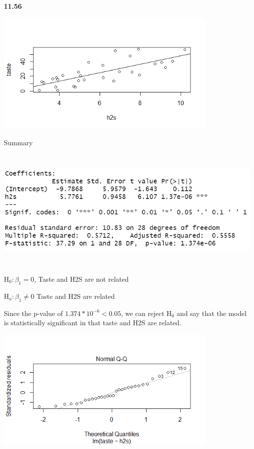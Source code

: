 \documentclass[12pt]{article}
\renewcommand\part[1]{\vspace{.10in}\textbf{#1}\par}
\begin{document}
\part{11.56}
	\begin{center}
	\includegraphics[width=.5\textwidth, height=60mm, keepaspectratio]{images/1156/h2s_taste_linear_regression.png}\par
	Summary\par
	\includegraphics[width=.5\textwidth, height=60mm, keepaspectratio]{images/1156/taste_H2S_summary.PNG}\par
	H$_{0}: \beta_{1} = 0$, Taste and H2S are not related\par
	H$_{a}: \beta_{1} \ne 0$ Taste and H2S are related\par
	Since the p-value of $1.374*10^{-6} < 0.05$, we can reject H$_{0}$ and say that the model is statistically significant in that taste and H2S are related.\par
	
	\includegraphics[width=.5\textwidth, height=60mm, keepaspectratio]{images/1156/1156qq.png}\par
	

\end{center}
\end{document}
